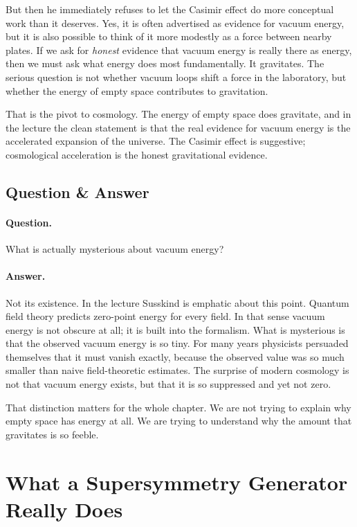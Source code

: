 But then he immediately refuses to let the Casimir effect do more conceptual work than it deserves. Yes, it is often advertised as evidence for vacuum energy, but it is also possible to think of it more modestly as a force between nearby plates. If we ask for \emph{honest} evidence that vacuum energy is really there as energy, then we must ask what energy does most fundamentally. It gravitates. The serious question is not whether vacuum loops shift a force in the laboratory, but whether the energy of empty space contributes to gravitation.

That is the pivot to cosmology. The energy of empty space does gravitate, and in the lecture the clean statement is that the real evidence for vacuum energy is the accelerated expansion of the universe. The Casimir effect is suggestive; cosmological acceleration is the honest gravitational evidence.

\subsection{Question \& Answer}

\paragraph{Question.} What is actually mysterious about vacuum energy?

\paragraph{Answer.} Not its existence. In the lecture Susskind is emphatic about this point. Quantum field theory predicts zero-point energy for every field. In that sense vacuum energy is not obscure at all; it is built into the formalism. What is mysterious is that the observed vacuum energy is so tiny. For many years physicists persuaded themselves that it must vanish exactly, because the observed value was so much smaller than naive field-theoretic estimates. The surprise of modern cosmology is not that vacuum energy exists, but that it is so suppressed and yet not zero.

That distinction matters for the whole chapter. We are not trying to explain why empty space has energy at all. We are trying to understand why the amount that gravitates is so feeble.

\section{What a Supersymmetry Generator Really Does}

